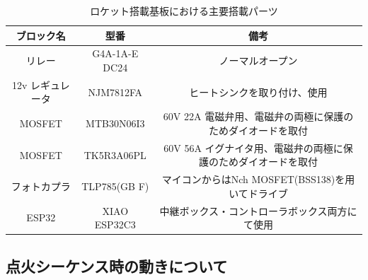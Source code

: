 \documentclass[dvipdfmx,a4j]{jsarticle}
\begin{document}
\begin{table}[htbp]
    \begin{tabular}{c|c|c}
        \hline
        ブロック名      & 型番            & 備考                                  \\ \hline \hline
        リレー        & G4A-1A-E DC24 & ノーマルオープン                            \\ \hline
        12v レギュレータ & NJM7812FA     & ヒートシンクを取り付け、使用                      \\ \hline
        MOSFET     & MTB30N06I3    & 60V 22A 電磁弁用、電磁弁の両極に保護のためダイオードを取付   \\ \hline
        MOSFET     & TK5R3A06PL    & 60V 56A イグナイタ用、電磁弁の両極に保護のためダイオードを取付 \\ \hline
        フォトカプラ     & TLP785(GB F)  & マイコンからはNch MOSFET(BSS138)を用いてドライブ   \\ \hline
        ESP32      & XIAO ESP32C3  & 中継ボックス・コントローラボックス両方にて使用             \\
        \hline
    \end{tabular}
    \caption{ロケット搭載基板における主要搭載パーツ}
    \label{GSEAviPartList}
\end{table}

\subsection{点火シーケンス時の動きについて}
\end{document}
